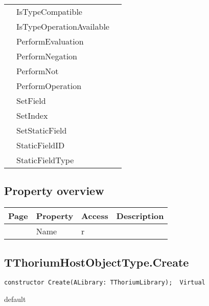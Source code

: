 \begin{tabularx}{\textwidth}{llX}
\pageref{thoriumcore:thorium:tthoriumhostobjecttype:istypecompatible} & IsTypeCompatible  &  \\
\pageref{thoriumcore:thorium:tthoriumhostobjecttype:istypeoperationavailable} & IsTypeOperationAvailable  &  \\
\pageref{thoriumcore:thorium:tthoriumhostobjecttype:performevaluation} & PerformEvaluation  &  \\
\pageref{thoriumcore:thorium:tthoriumhostobjecttype:performnegation} & PerformNegation  &  \\
\pageref{thoriumcore:thorium:tthoriumhostobjecttype:performnot} & PerformNot  &  \\
\pageref{thoriumcore:thorium:tthoriumhostobjecttype:performoperation} & PerformOperation  &  \\
\pageref{thoriumcore:thorium:tthoriumhostobjecttype:setfield} & SetField  &  \\
\pageref{thoriumcore:thorium:tthoriumhostobjecttype:setindex} & SetIndex  &  \\
\pageref{thoriumcore:thorium:tthoriumhostobjecttype:setstaticfield} & SetStaticField  &  \\
\pageref{thoriumcore:thorium:tthoriumhostobjecttype:staticfieldid} & StaticFieldID  &  \\
\pageref{thoriumcore:thorium:tthoriumhostobjecttype:staticfieldtype} & StaticFieldType  &  \\
\hline
\end{tabularx}
\subsection{Property overview}
\label{thoriumcore:thorium:tthoriumhostobjecttype:properties}
\begin{tabularx}{\textwidth}{lllX}
Page & Property & Access & Description \\ \hline
\pageref{thoriumcore:thorium:tthoriumhostobjecttype:name} & Name & r &  \\
\hline
\end{tabularx}
\subsection{TThoriumHostObjectType.Create}
\label{thoriumcore:thorium:tthoriumhostobjecttype:create}
\begin{FPCList}
\Synopsis
\Declaration 

\begin{verbatim}
constructor Create(ALibrary: TThoriumLibrary);  Virtual
\end{verbatim}
\Visibility
default
\Description
\Errors
\end{FPCList}
